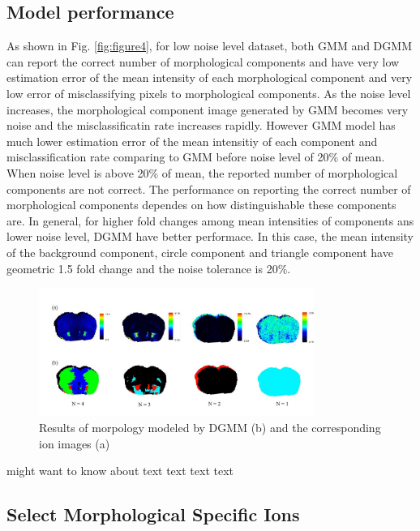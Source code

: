 \documentclass{bioinfo}
\begin{document}
\subsection{Model performance}

As shown in Fig. \ref{fig:figure4}, for low noise level dataset, both GMM and DGMM can report the correct number of morphological components and have very low estimation error of the mean intensity of each morphological component and very low error of misclassifying pixels to morphological components. As the noise level increases, the morphological component image generated by GMM becomes very noise and the misclassificatin rate increases rapidly. However GMM model has much lower estimation error of the mean intensitiy of each component and misclassification rate comparing to GMM before noise level of 20\% of mean. When noise level is above 20\% of mean, the reported number of morphological components are not correct. The performance on reporting the correct number of morphological components dependes on how distinguishable these components are. In general, for higher fold changes among mean intensities of components ans lower noise level, DGMM have better performace. In this case, the mean intensity of the background component,  circle component and triangle component have geometric 1.5 fold change and the noise tolerance is 20\%.


\begin{figure}[b!]
    \centering
	\includegraphics[width=0.8\textwidth]{figure5.jpg}
    \caption{Results of morpology modeled by DGMM (b) and the corresponding ion images (a)}
    \label{fig:figure5}
\end{figure}
\citealp{Boffelli03} might want to know about text text text
text\vspace*{1pt}

\subsection{Select Morphological Specific Ions}
\end{document}
